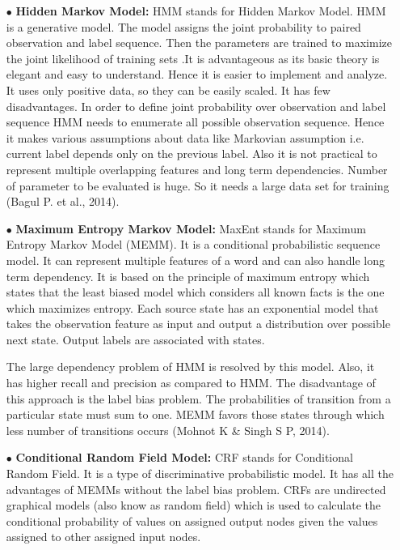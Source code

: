 \documentclass[12pt,a4paper,oneside]{memoir}
\begin{document}
\begin{enumerate}
\begin{itemize}
  \item[$\bullet$]\textbf{Hidden Markov Model:} HMM stands for Hidden Markov Model. HMM is a generative model. The model assigns the joint probability to paired observation and label sequence. Then the parameters are trained to maximize the joint likelihood of training sets .It is advantageous as its basic theory is elegant and easy to understand. Hence it is easier to implement and analyze. It uses only positive data, so they can be easily scaled. It has few disadvantages. In order to define joint probability over observation and label sequence HMM needs to enumerate all possible observation sequence. Hence it makes various assumptions about data like Markovian assumption i.e. current label depends only on the previous label. Also it is not practical to represent multiple overlapping features and long term dependencies. Number of parameter to be evaluated is huge. So it needs a large data set for training (Bagul P. et al., 2014).

  \item[$\bullet$] \textbf{ Maximum Entropy Markov Model:} MaxEnt stands for Maximum Entropy Markov Model (MEMM). It is a conditional probabilistic sequence model. It can represent multiple features of a word and can also handle long term dependency. It is based on the principle of maximum entropy which states that the least biased model which considers all known facts is the one which maximizes entropy. Each source state has an exponential model that takes the observation feature as input and output a distribution over possible next state. Output labels are associated with states.

The large dependency problem of HMM is resolved by this model. Also, it has higher recall and precision as compared to HMM. The disadvantage of this approach is the label bias problem. The probabilities of transition from a particular state must sum to one. MEMM favors those states through which less number of transitions occurs (Mohnot K \& Singh S P, 2014).

  \item[$\bullet$] \textbf{Conditional Random Field Model:} CRF stands for Conditional Random Field. It is a type of discriminative probabilistic model. It has all the advantages of MEMMs without the label bias problem. CRFs are undirected graphical models (also know as random field) which is used to calculate the conditional probability of values on assigned output nodes given the values assigned to other assigned input nodes.
\end{itemize}


\end{enumerate}
\end{document}
